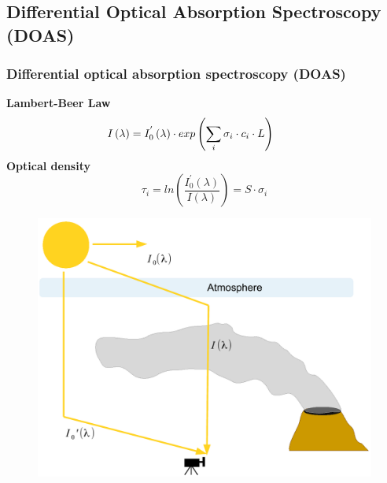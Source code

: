 \documentclass[aspectratio=169]{beamer} %
\begin{document}
	\subsection{Differential Optical Absorption Spectroscopy (DOAS)}
	\begin{frame}
		\frametitle{\color{mygreen}Differential optical absorption spectroscopy (DOAS)\\%
		\color{mygreen}{\rule{0.8\textwidth}{2pt}}}
	\vspace{-1cm}
	\begin{block}{}
		\begin{multicols}{2}
			\textbf{Lambert-Beer Law} \\
			\vspace{-0.5cm}
			\begin{equation*}
			\hspace*{-0.9cm}I\left(\lambda \right) = I^{'}_{0}\left(\lambda\right)\cdot exp\left(\sum_{i}\sigma_{i}\cdot c_{i}\cdot L \right)
			\end{equation*}
			\textbf{Optical density}
			\vspace{-0.5cm}
			\begin{equation*}
			\tau_{i} = ln\left(\frac{I^{'}_{0}\left(\lambda\right)}{I(\lambda)}\right) = S\cdot\sigma_{i}
			\end{equation*}
		\end{multicols}	
	\end{block}
	\begin{multicols}{2}
		\begin{figure}
			\centering
			\includegraphics[width=0.85\linewidth]{../../Bilder/DOASFunction}
			\label{fig:doasfunction}
		\end{figure}

\end{multicols}
\end{frame}
\end{document}
